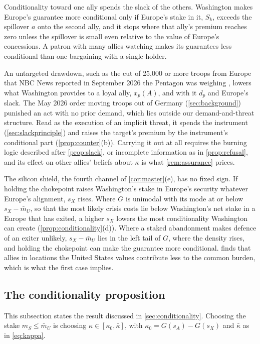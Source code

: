 Conditionality toward one ally spends the slack of the others. Washington makes Europe's guarantee more conditional only if Europe's stake in it, $S_k$, exceeds the spillover $a$ onto the second ally, and it stops where that ally's premium reaches zero unless the spillover is small even relative to the value of Europe's concessions. A patron with many allies watching makes its guarantees less conditional than one bargaining with a single holder.

An untargeted drawdown, such as the cut of 25,000 or more troops from Europe that NBC News reported in September 2026 the Pentagon was weighing \citep{nbc2026pentagon}, lowers what Washington provides to a loyal ally, $x_p(A)$, and with it $d_p$ and Europe's slack. The May 2026 order moving troops out of Germany (\cref{sec:background}) punished an act with no prior demand, which lies outside our demand-and-threat structure. Read as the execution of an implicit threat, it spends the instrument (\cref{sec:slackprinciple}) and raises the target's premium by the instrument's conditional part (\cref{prop:counter}(b)). Carrying it out at all requires the burning logic described after \cref{prop:slack}, or incomplete information as in \cref{prop:refusal}, and its effect on other allies' beliefs about $\kappa$ is what \cref{rem:assurance} prices.

The silicon shield, the fourth channel of \cref{cor:master}(e), has no fixed sign. If holding the chokepoint raises Washington's stake in Europe's security whatever Europe's alignment, $s_X$ rises. Where $G$ is unimodal with its mode at or below $s_X-\bar m_U$, so that the most likely crisis costs lie below Washington's net stake in a Europe that has exited, a higher $s_X$ lowers the most conditionality Washington can create (\cref{prop:conditionality}(d)). Where a staked abandonment makes defence of an exiter unlikely, $s_X-\bar m_U$ lies in the left tail of $G$, where the density rises, and holding the chokepoint can make the guarantee more conditional. \citet{blankenship2021price} finds that allies in locations the United States values contribute less to the common burden, which is what the first case implies.

\subsection{The conditionality proposition}\label{app:conditionality}

This subsection states the result discussed in \cref{sec:conditionality}. Choosing the stake $m_S\le\bar m_U$ is choosing $\kappa\in[\kappa_0,\bar\kappa]$, with $\kappa_0=G(s_A)-G(s_X)$ and $\bar\kappa$ as in \cref{eq:kappa}.

